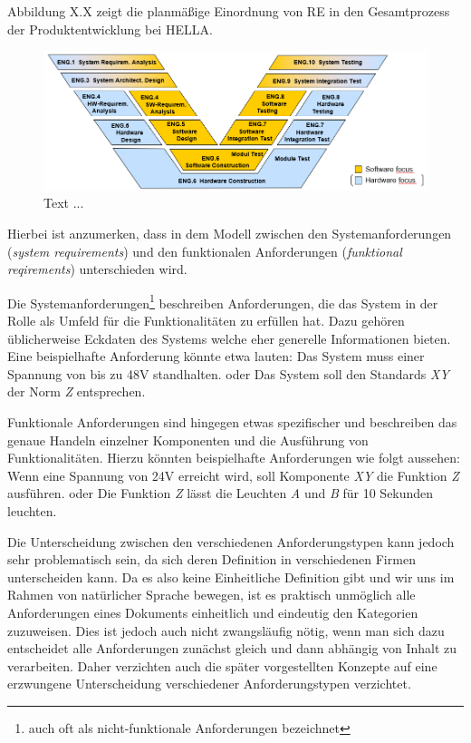 \documentclass[12pt]{report}
\begin{document}
Abbildung X.X zeigt die planmäßige Einordnung von RE in den Gesamtprozess der Produktentwicklung bei HELLA. 

\begin{figure}[h!]
\begin{center}
\includegraphics[scale=0.7]{Bilder/V-Modell.png}
\caption{Text ... }
\end{center}
\end{figure}

Hierbei ist anzumerken, dass in dem Modell zwischen den Systemanforderungen (\textit{system requirements}) und den funktionalen Anforderungen (\textit{funktional reqirements}) unterschieden wird. 

Die Systemanforderungen\footnote{auch oft als nicht-funktionale Anforderungen bezeichnet} beschreiben Anforderungen, die das System in der Rolle als Umfeld für die Funktionalitäten zu erfüllen hat. Dazu gehören üblicherweise Eckdaten des Systems welche eher generelle Informationen bieten. Eine beispielhafte Anforderung könnte etwa lauten: \glqq Das System muss einer Spannung von bis zu 48V standhalten.\grqq{} oder \glqq Das System soll den Standards \textit{XY} der Norm \textit{Z} entsprechen.\grqq

Funktionale Anforderungen sind hingegen etwas spezifischer und beschreiben das genaue Handeln einzelner Komponenten und die Ausführung von Funktionalitäten. Hierzu könnten beispielhafte Anforderungen wie folgt aussehen: \glqq Wenn eine Spannung von 24V erreicht wird, soll Komponente \textit{XY} die Funktion \textit{Z} ausführen.\grqq{} oder \glqq Die Funktion \textit{Z} lässt die Leuchten \textit{A} und \textit{B} für 10 Sekunden leuchten.\grqq

Die Unterscheidung zwischen den verschiedenen Anforderungstypen kann jedoch sehr problematisch sein, da sich deren Definition in verschiedenen Firmen unterscheiden kann. Da es also keine Einheitliche Definition gibt und wir uns im Rahmen von natürlicher Sprache bewegen, ist es praktisch unmöglich alle Anforderungen eines Dokuments einheitlich und eindeutig den Kategorien zuzuweisen. Dies ist jedoch auch nicht zwangsläufig nötig, wenn man sich dazu entscheidet alle Anforderungen zunächst gleich und dann abhängig von Inhalt zu verarbeiten. Daher verzichten auch die später vorgestellten Konzepte auf eine erzwungene Unterscheidung verschiedener Anforderungstypen verzichtet.
\end{document}
